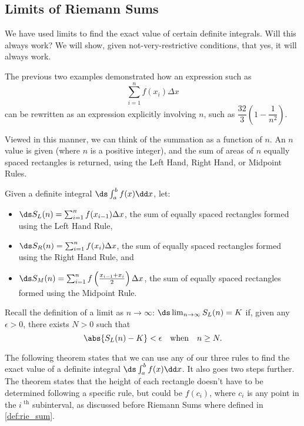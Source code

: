 \subsection{Limits of Riemann Sums}

We have used limits to find the exact value of certain definite integrals. Will this always work? We will show, given not-very-restrictive conditions, that yes, it will always work.

The previous two examples demonstrated how an expression such as
\[\sum_{i=1}^n f(x_i)\Delta x\]
can be rewritten as an expression explicitly involving $n$, such as $\dfrac{32}3(1-\dfrac1{n^2})$.

Viewed in this manner, we can think of the summation as a function of $n$. An $n$ value is given (where $n$ is a positive integer), and the sum of areas of $n$ equally spaced rectangles is returned, using the Left Hand, Right Hand, or Midpoint Rules. 

Given a definite integral $\ds\int_a^b f(x)\dd x$, let:
\begin{itemize}
	\item	$\ds S_L(n) = \sum_{i=1}^n f(x_{i-1})\Delta x$, the sum of equally spaced rectangles formed using the Left Hand Rule,
	\item	$\ds S_R(n) = \sum_{i=1}^n f(x_i)\Delta x$, the sum of equally spaced rectangles formed using the Right Hand Rule, and
	\item	$\ds S_M(n) = \sum_{i=1}^n f\left(\frac{x_{i-1}+x_i}{2}\right)\Delta x$, the sum of equally spaced rectangles formed using the Midpoint Rule.
\end{itemize}
	
Recall the definition of a limit as $n\to\infty$: $\ds\lim_{n\to\infty}S_L(n) = K$ if, given any $\epsilon>0$, there exists $N>0$ such that
\[\abs{S_L(n)-K}< \epsilon \quad \text{when}\quad n\geq N.\]

The following theorem states that we can use any of our three rules to find the exact value of a definite integral $\ds\int_a^b f(x)\dd x$. It also goes two steps further. The theorem states that the height of each rectangle doesn't have to be determined following a specific rule, but could be $f(c_i)$, where $c_i$ is any point in the $i^\text{ th}$ subinterval, as discussed before Riemann Sums where defined in \autoref{def:rie_sum}.

